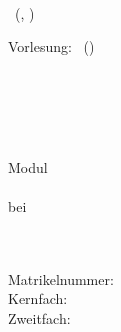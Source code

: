 \ifdefined\layoutsmallheader
\begin{small}
\noindent \meta \\ \autor
\ifdefined\layoutonlyname
\else
  \ (\matrikelnummer, \email)
\fi
\end{small}
\vskip 0.8cm
\begin{center}\begin{large}\titel\end{large}\end{center}
\vskip 0.1cm
\fi

\ifdefined\layouttitle
\begin{center}
{%
    \scshape\Large\onehalfspacing
    \titel \par}
\end{center}
\vskip 0.5cm
\fi

\ifdefined\layoutzettel
\pagestyle{empty}
\newcommand{\header}{Vorlesung: \vorlesung \hfill  \autor \, (\matrikelnummer)\\ \zettel \hfill \gruppe \\ \datum}
\header
\fi

\ifdefined\layouttitlepage
\thispagestyle{empty}
\begin{titlepage}
\singlespacing

\quad \\[4cm]

\begin{center}
\begin{minipage}{0.9\linewidth}
\begin{center}
\textsc{\MakeLowercase{\autor}} \\[1cm]
{%
    \scshape\Large\onehalfspacing
    \titel \par}
\end{center}
\end{minipage}

\vskip 3.8cm
\emph{\art}
\end{center}

\vfill

\noindent\begin{minipage}{0.5\linewidth}
Modul \emph{\modul} \\
\veranstaltung \\
bei \dozentin \\
\institut \\
\universitaet
\end{minipage}
\begin{minipage}{0.5\linewidth}
\begin{flushright}
\email \\
Matrikelnummer: \matrikelnummer \\
Kernfach:  \\
Zweitfach: \zweitfach \\
\datum
\end{flushright}
\end{minipage}
\end{titlepage}
\fi

